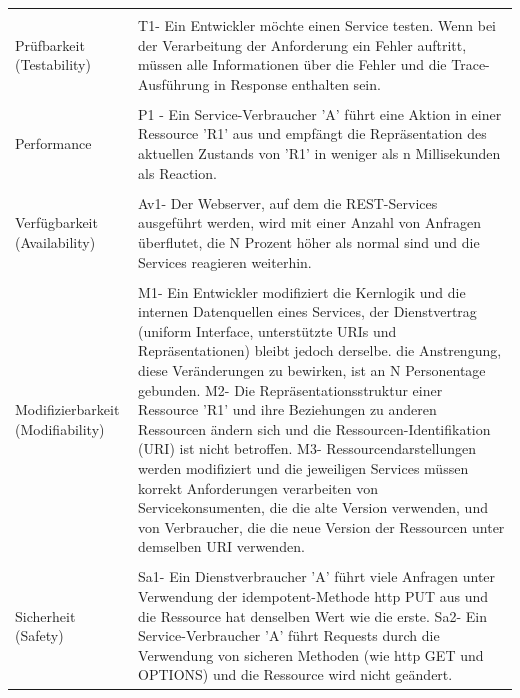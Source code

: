 \documentclass{acmsiggraph}
\begin{document}
\begin{center}
\begin{xtabular}{|C{2cm}|L{6cm}|}
 \\ 
       \hline
      & \\[-2ex]
     Prüfbarkeit  (Testability) & 
     T1- Ein Entwickler möchte einen Service testen. Wenn bei der Verarbeitung der Anforderung ein Fehler auftritt, müssen alle Informationen über die Fehler und die Trace-Ausführung in Response enthalten sein. 
 \\ 
    \hline
    & \\[-2ex]
     Performance & 
     P1 - Ein Service-Verbraucher 'A' führt eine Aktion in einer Ressource 'R1' aus und empfängt die Repräsentation des aktuellen Zustands von 'R1' in weniger als n Millisekunden als Reaction.\\ 
       \hline
       & \\[-2ex]
     Verfügbarkeit (Availability) & 
     Av1- Der Webserver, auf dem die REST-Services ausgeführt werden, wird mit einer Anzahl von Anfragen überflutet, die N Prozent höher als normal sind und die Services reagieren weiterhin.
 \\ 
 \hline
 & \\[-2ex]
     Modifizierbarkeit  (Modifiability) & 
     M1- Ein Entwickler modifiziert die Kernlogik und die internen Datenquellen eines  Services, der Dienstvertrag (uniform Interface, unterstützte URIs und Repräsentationen) bleibt jedoch derselbe. die Anstrengung, diese Veränderungen zu bewirken, ist an N Personentage gebunden.
M2- Die Repräsentationsstruktur einer Ressource 'R1' und ihre Beziehungen zu anderen Ressourcen ändern sich und die Ressourcen-Identifikation (URI) ist nicht betroffen.
M3- Ressourcendarstellungen werden modifiziert und die jeweiligen Services müssen korrekt Anforderungen  verarbeiten von Servicekonsumenten, die die alte Version verwenden, und von Verbraucher, die die neue Version der Ressourcen unter demselben URI verwenden.

 \\ 
       \hline
       & \\[-2ex]
     Sicherheit  (Safety) & 
     Sa1- Ein Dienstverbraucher 'A' führt viele Anfragen unter Verwendung der idempotent-Methode http PUT aus und die Ressource hat denselben Wert wie die erste.
Sa2- Ein Service-Verbraucher 'A' führt Requests durch die Verwendung von sicheren Methoden (wie http GET und OPTIONS) und die Ressource wird nicht geändert.


\end{xtabular}
\end{center}
\end{document}
